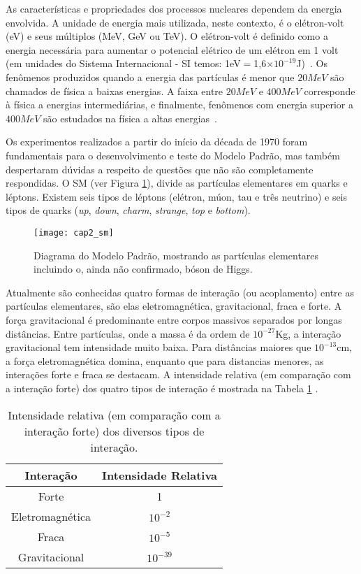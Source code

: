 As características e propriedades dos processos nucleares dependem
da ener\-gia envolvida. A unidade de energia mais utilizada,
neste contexto, é o elétron-volt (eV) e seus múltiplos (MeV, GeV ou
TeV). O elétron-volt é definido como a energia necessária para
aumentar o potencial elétrico de um elétron em 1 volt (em unidades
do Sistema Internacional - SI temos: 1eV$=$1,6$\times
10^{-19}$J)~\cite{book:martin:2006}. Os fenômenos produzidos quando
a energia das partículas é menor que $20MeV$ são chamados de física
a baixas energias. A faixa entre $20MeV$ e $400MeV$ corresponde à
física a energias intermediárias, e finalmente, fenômenos com
energia superior a $400MeV$ são estudados na física a altas
energias~\cite{book:chung:2001}.


Os experimentos realizados a partir do início da década de 1970
foram fundamentais para o desenvolvimento e teste do Modelo Padrão,
mas também despertaram dúvidas a respeito de questões que não são
completamente respondidas. O SM (ver Figura \ref{SM}), divide as
partículas elementares em quarks e léptons. Existem seis tipos de
léptons (elétron, múon, tau e três neutrino) e seis tipos de quarks
(\textit{up}, \textit{down}, \textit{charm}, \textit{strange},
\textit{top} e \textit{bottom}).

\begin{figure}[h!] \centering
\texttt{[image: cap2\_sm]}
\caption{Diagrama do Modelo Padrão, mostrando as partículas
elementares incluindo o, ainda não confirmado, bóson de Higgs.}
\label{SM}
\end{figure}

Atualmente são conhecidas quatro formas de interação (ou
acoplamento) entre as partículas elementares, são elas
eletromagnética, gravitacional, fraca e forte. A força gravitacional
é predominante entre corpos massivos separados por longas
distâncias. Entre partículas, onde a massa é da ordem de
$10^{-27}$Kg, a interação gravitacional tem intensidade muito baixa.
Para distâncias maiores que $10^{-13}$cm, a força eletromagnética
domina, enquanto que para distancias menores, as interações forte e
fraca se destacam. A intensidade relativa (em comparação com a interação forte) dos quatro tipos de
interação é mostrada na Tabela \ref{tab_forcas}
\cite{book:mist:2003}.

\begin{table}[b!]
\centering
\begin{tabular}{cc }
  \hline
  \textbf{Interação} & \textbf{Intensidade Relativa} \\  \hline
  Forte  &  1 \\
  Eletromagnética  & $10^{-2}$\\
  Fraca & $10^{-5}$ \\
  Gravitacional & $10^{-39}$ \\
  \hline
\end{tabular}
\caption{Intensidade relativa (em comparação com a interação forte) dos diversos tipos de interação.}
\label{tab_forcas}
\end{table}

